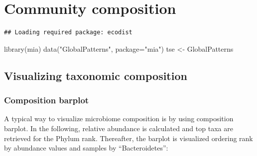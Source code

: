 \documentclass[
]{book}
\newenvironment{Shaded}{\begin{snugshade}}{\end{snugshade}}
\newcommand{\AttributeTok}[1]{\textcolor[rgb]{0.77,0.63,0.00}{#1}}
\newcommand{\FunctionTok}[1]{\textcolor[rgb]{0.00,0.00,0.00}{#1}}
\newcommand{\NormalTok}[1]{#1}
\newcommand{\OtherTok}[1]{\textcolor[rgb]{0.56,0.35,0.01}{#1}}
\newcommand{\StringTok}[1]{\textcolor[rgb]{0.31,0.60,0.02}{#1}}
\begin{document}
\hypertarget{microbiome-community}{%
\chapter{Community composition}\label{microbiome-community}}

\begin{verbatim}
## Loading required package: ecodist
\end{verbatim}

\begin{Shaded}
\begin{Highlighting}[]
\FunctionTok{library}\NormalTok{(mia)}
\FunctionTok{data}\NormalTok{(}\StringTok{"GlobalPatterns"}\NormalTok{, }\AttributeTok{package=}\StringTok{"mia"}\NormalTok{)}
\NormalTok{tse }\OtherTok{\textless{}{-}}\NormalTok{ GlobalPatterns}
\end{Highlighting}
\end{Shaded}

\hypertarget{visualizing-taxonomic-composition}{%
\section{Visualizing taxonomic composition}\label{visualizing-taxonomic-composition}}

\hypertarget{composition-barplot}{%
\subsection{Composition barplot}\label{composition-barplot}}

A typical way to visualize microbiome composition is by using
composition barplot. In the following, relative abundance is
calculated and top taxa are retrieved for the Phylum rank. Thereafter,
the barplot is visualized ordering rank by abundance values and
samples by ``Bacteroidetes'':
\end{document}
